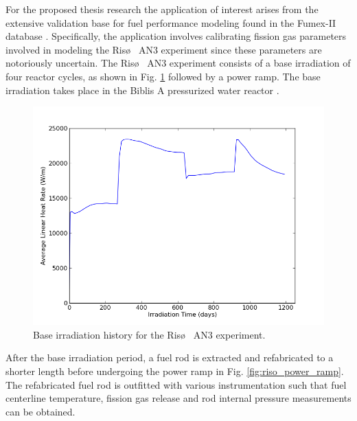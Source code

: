 For the proposed thesis research the application of interest arises from the extensive validation base for fuel performance modeling found in the Fumex-II database \cite{fumex2}. 
Specifically, the application involves calibrating fission gas parameters involved in modeling the Ris\o~ AN3 experiment since these parameters are notoriously uncertain. The Ris\o~ AN3 experiment consists of a base irradiation of four reactor cycles, as shown in Fig. \ref{fig:riso_base_irradiation} followed by a power ramp. The base irradiation takes place in the Biblis A pressurized water reactor \cite{fumex2}. 
\begin{figure}
\caption{\label{fig:riso_base_irradiation}
Base irradiation history for the Ris\o~ AN3 experiment.}
 \begin{center}
  \includegraphics[scale=.75]{./Chapter4/base_irrad.png}
 \end{center}
\end{figure}     
After the base irradiation period, a fuel rod is extracted and refabricated to a shorter length before undergoing the power ramp in Fig. \ref{fig:riso_power_ramp}. The refabricated fuel rod is outfitted with various instrumentation such that fuel centerline temperature, fission gas release and rod internal pressure measurements can be obtained.  
